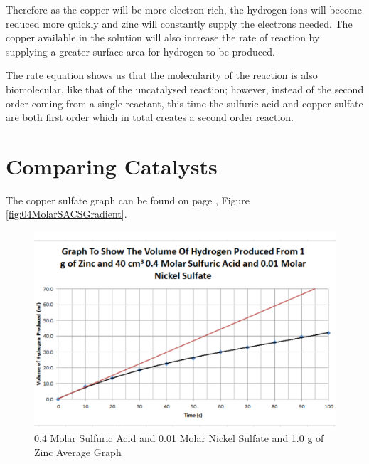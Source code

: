 Therefore as the copper will be more electron rich, the hydrogen ions will become reduced more quickly and zinc will constantly supply the electrons needed. The copper available in the solution will also increase the rate of reaction by supplying a greater surface area for hydrogen to be produced.

The rate equation shows us that the molecularity of the reaction is also biomolecular, like that of the uncatalysed reaction; however, instead of the second order coming from a single reactant, this time the sulfuric acid and copper sulfate are both first order which in total creates a second order reaction. 







\section{Comparing Catalysts}

The copper sulfate graph can be found on page \pageref{fig:04MolarSACSGradient}, Figure \ref{fig:04MolarSACSGradient}.

\begin{figure}[H]
    \includegraphics[width=\textwidth]{./Analysis/Images/4DifferentCatalysts/Nickel.pdf}
    \caption{0.4 Molar Sulfuric Acid and 0.01 Molar Nickel Sulfate and 1.0 g of Zinc Average Graph} \label{fig:NickelGradient}
\end{figure}


